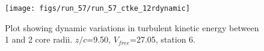 \begin{figure}[H]
\centering
\texttt{[image: figs/run\_57/run\_57\_ctke\_12rdynamic]}
\caption{Plot showing dynamic variations in turbulent kinetic energy between 1 and 2 core radii. $z/c$=9.50, $V_{free}$=27.05, station 6.}
\label{fig:run_57_ctke_12rdynamic}
\end{figure}



